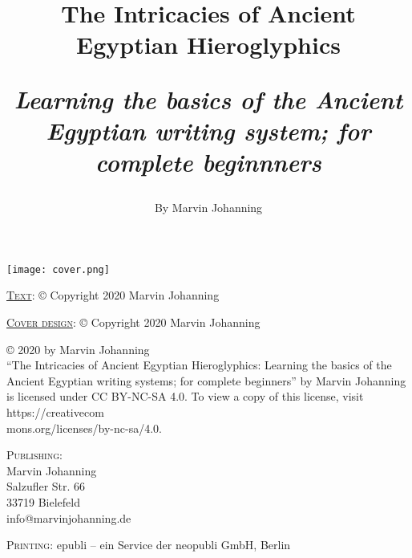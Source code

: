 \documentclass[a5paper,twoside,11pt]{report}
\begin{document}

\thispagestyle{empty}
\begin{center}
	\texttt{[image: cover.png]}
\end{center}
\newpage

\thispagestyle{empty}
  \mbox{}
  \newpage

\title{%
  The Intricacies of Ancient Egyptian Hieroglyphics\\
  \begin{center}
    \textit{Learning the basics of the Ancient Egyptian writing system; for complete beginnners}
  \end{center}
}
\author{By Marvin Johanning}
\date{}
\maketitle

\thispagestyle{empty}
\noindent\textsc{\underline{Text}}: © Copyright 2020 Marvin Johanning

\noindent\textsc{\underline{Cover design}}: © Copyright 2020 Marvin Johanning

\noindent© 2020 by Marvin Johanning\\``The Intricacies of Ancient Egyptian Hieroglyphics: Learning the basics of the Ancient Egyptian writing systems; for complete beginners'' by Marvin Johanning is licensed under CC BY-NC-SA 4.0. To view a copy of this license, visit https://creativecom\\mons.org/licenses/by-nc-sa/4.0.

\vspace{10mm}\noindent\textsc{Publishing}: \\
Marvin Johanning\\
Salzufler Str. 66\\
33719 Bielefeld\\
info@marvinjohanning.de

\vspace{5mm}\noindent\textsc{Printing}: epubli – ein Service der neopubli GmbH, Berlin
\newpage
\end{document}
